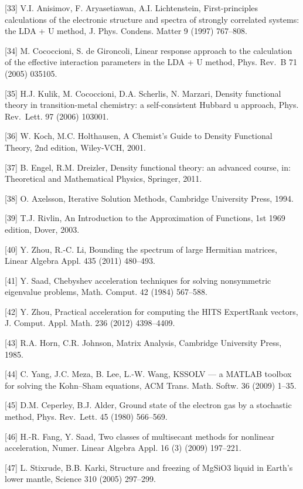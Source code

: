 \documentclass[
  10
]{article}
\begin{document}
{[}33{]} V.I. Anisimov, F. Aryasetiawan, A.I. Lichtenstein,
First-principles calculations of the electronic structure and spectra of
strongly correlated systems: the LDA + U method, J. Phys. Condens.
Matter 9 (1997) 767--808.

{[}34{]} M. Cococcioni, S. de Gironcoli, Linear response approach to the
calculation of the effective interaction parameters in the LDA + U
method, Phys. Rev.~B 71 (2005) 035105.

{[}35{]} H.J. Kulik, M. Cococcioni, D.A. Scherlis, N. Marzari, Density
functional theory in transition-metal chemistry: a self-consistent
Hubbard u approach, Phys. Rev.~Lett. 97 (2006) 103001.

{[}36{]} W. Koch, M.C. Holthausen, A Chemist's Guide to Density
Functional Theory, 2nd edition, Wiley-VCH, 2001.

{[}37{]} B. Engel, R.M. Dreizler, Density functional theory: an advanced
course, in: Theoretical and Mathematical Physics, Springer, 2011.

{[}38{]} O. Axelsson, Iterative Solution Methods, Cambridge University
Press, 1994.

{[}39{]} T.J. Rivlin, An Introduction to the Approximation of Functions,
1st 1969 edition, Dover, 2003.

{[}40{]} Y. Zhou, R.-C. Li, Bounding the spectrum of large Hermitian
matrices, Linear Algebra Appl. 435 (2011) 480--493.

{[}41{]} Y. Saad, Chebyshev acceleration techniques for solving
nonsymmetric eigenvalue problems, Math. Comput. 42 (1984) 567--588.

{[}42{]} Y. Zhou, Practical acceleration for computing the HITS
ExpertRank vectors, J. Comput. Appl. Math. 236 (2012) 4398--4409.

{[}43{]} R.A. Horn, C.R. Johnson, Matrix Analysis, Cambridge University
Press, 1985.

{[}44{]} C. Yang, J.C. Meza, B. Lee, L.-W. Wang, KSSOLV --- a MATLAB
toolbox for solving the Kohn--Sham equations, ACM Trans. Math. Softw. 36
(2009) 1--35.

{[}45{]} D.M. Ceperley, B.J. Alder, Ground state of the electron gas by
a stochastic method, Phys. Rev.~Lett. 45 (1980) 566--569.

{[}46{]} H.-R. Fang, Y. Saad, Two classes of multisecant methods for
nonlinear acceleration, Numer. Linear Algebra Appl. 16 (3) (2009)
197--221.

{[}47{]} L. Stixrude, B.B. Karki, Structure and freezing of MgSiO3
liquid in Earth's lower mantle, Science 310 (2005) 297--299.
\end{document}
